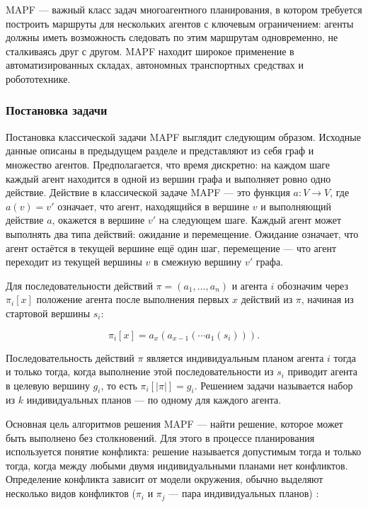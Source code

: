 MAPF --- важный класс задач многоагентного планирования, в котором требуется построить маршруты для
нескольких агентов с ключевым ограничением: агенты должны иметь возможность следовать по этим маршрутам
одновременно, не сталкиваясь друг с другом. MAPF находит широкое применение в автоматизированных складах,
автономных транспортных средствах и робототехнике.

\subsubsection{Постановка задачи}

Постановка классической задачи MAPF выглядит следующим образом. Исходные данные описаны в предыдущем
разделе и представляют из себя граф и множество агентов. Предполагается, что время дискретно: на 
каждом шаге каждый агент находится в одной из вершин графа и
выполняет ровно одно действие. Действие в классической задаче MAPF --- это функция $a : V \to V$,
где $a(v) = v'$ означает, что агент, находящийся в вершине $v$ и выполняющий действие $a$, окажется
в вершине $v'$ на следующем шаге. Каждый агент может выполнять два типа действий: ожидание и
перемещение. Ожидание означает, что агент остаётся в текущей вершине ещё один шаг, перемещение ---
что агент переходит из текущей вершины $v$ в смежную вершину $v'$ графа.

Для последовательности действий $\pi = (a_1, \ldots, a_n)$ и агента $i$ обозначим через $\pi_i[x]$
положение агента после выполнения первых $x$ действий из $\pi$, начиная из стартовой вершины $s_i$:

\begin{equation}
    \pi_i[x] = a_x\!\left(a_{x-1}\!\left(\cdots a_1(s_i)\right)\right).
\end{equation}

Последовательность действий $\pi$ является индивидуальным планом агента $i$ тогда и только тогда,
когда выполнение этой последовательности из $s_i$ приводит агента в целевую вершину $g_i$, то есть
$\pi_i[|\pi|] = g_i$. Решением задачи называется набор из $k$ индивидуальных планов --- по одному
для каждого агента.

Основная цель алгоритмов решения MAPF --- найти решение, 
которое может быть выполнено без столкновений. Для этого в процессе планирования используется понятие
конфликта: решение называется допустимым тогда и только тогда, когда между любыми двумя
индивидуальными планами нет конфликтов. Определение конфликта зависит от модели окружения, обычно 
выделяют несколько видов конфликтов ($\pi_i$ и $\pi_j$ --- пара
индивидуальных планов) \cite{mapf-definition}:

